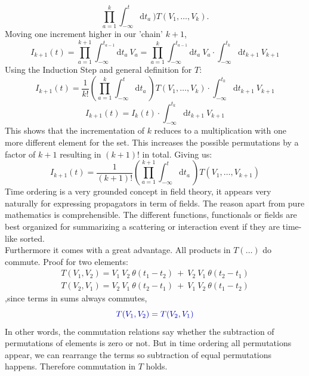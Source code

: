 \documentclass[12pt, titlepage]{article}
\begin{document}
\begin{appendices}
\begin{equation}
 \prod_{a=1}^{k} 
\int_{-\infty}^{t}\mathrm{d}t_a\
)
T(V_1,\ldots,V_k).
\end{equation}
Moving one increment higher in our 'chain' $ k+1 $,
\\
\begin{equation}
I_{k+1} (t)
=
 \prod_{a=1}^{k+1} 
 \int_{-\infty}^{t_{a-1}}\mathrm{d}t_a\
  V_a
  =
   \prod_{a=1}^{k} 
 \int_{-\infty}^{t_{a-1}}\mathrm{d}t_a\
  V_a
  \cdot
 \int_{-\infty}^{t_{k}}\mathrm{d}t_{k+1}\
 V_{k+1}
\end{equation}
Using the Induction Step and general definition for $ T $:
\\
\begin{equation}
I_{k+1} (t)
=
\dfrac{1}{k!}
 (
 \prod_{a=1}^{k} 
\int_{-\infty}^{t}\mathrm{d}t_a\
)
T(V_1,\ldots,V_k)
\cdot
 \int_{-\infty}^{t_{k}}\mathrm{d}t_{k+1}\
 V_{k+1}
\end{equation}
\begin{equation}
I_{k+1} (t)
=
I_k (t)
\cdot
 \int_{-\infty}^{t_{k}}\mathrm{d}t_{k+1}\
 V_{k+1}
\end{equation}
This shows that the incrementation of $ k $ reduces to a multiplication with one more different element for the set. This increases the possible permutations by a factor of $ k+1 $ resulting in $ (k+1)! $ in total. Giving us:
\begin{equation}
I_{k+1}(t)
=
\dfrac{1}{(k+1)!}
 (
 \prod_{a=1}^{k+1} 
\int_{-\infty}^{t}\mathrm{d}t_a\
)
T(V_1,\ldots,V_{k+1})
\end{equation}
Time ordering is a very grounded concept in field theory, it appears very naturally for expressing propagators in term of fields. The reason apart from pure mathematics is comprehensible. The different functions, functionals or fields are best organized for summarizing a scattering or interaction event if they are time-like sorted.
\\
Furthermore it comes with a great advantage. All products in $ T(\ldots) $ do commute. Proof for two elements:
\begin{subequations}
\begin{align}
T(V_1, V_2)=V_1\ V_2\ \theta (t_1 -t_2)\ +\ V_2\  V_1 \ \theta (t_2-t_1)
\\
T(V_2, V_1)=V_2\ V_1\ \theta (t_2 -t_1)\ +\ V_1\  V_2 \ \theta (t_1-t_2)
\end{align}
\end{subequations}
,since terms in sums always commutes,
\begin{equation}\textcolor[RGB]{0,0,204}{
T(V_1, V_2)=T(V_2, V_1)
}
\end{equation}
In other words, the commutation relations say whether the subtraction of permutations of elements is zero or not. But in time ordering all permutations appear, we can rearrange the terms so subtraction of equal permutations happens. Therefore commutation in $ T $ holds.

\end{appendices}
\end{document}
